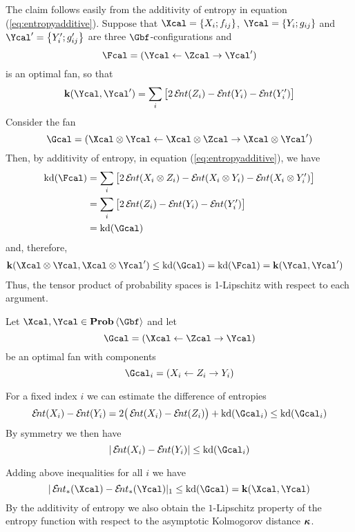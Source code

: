 \begin{Proof}
  The claim follows easily from the additivity of
  entropy in equation (\ref{eq:entropyadditive}). Suppose that
  $\Xcal=\set{X_{i};f_{ij}}$, $\Ycal=\set{Y_{i};g_{ij}}$ and
  $\Ycal'=\set{Y'_{i};g'_{ij}}$ are three $\Gbf$-configurations and
  \[
  \Fcal
  =
  (\Ycal\ot \Zcal\to \Ycal')
  \]
  is an optimal fan, so that
  \[
  \ikd(\Ycal,\Ycal')
  =
  \sum_{i} \big[2\ent(Z_{i})-\ent(Y_{i})-\ent(Y'_{i})\big]
  \]
  Consider the fan
  \[
  \Gcal
  =
  (\Xcal\otimes \Ycal\ot \Xcal\otimes \Zcal\to \Xcal\otimes \Ycal')
  \]
  Then, by additivity of entropy, in equation (\ref{eq:entropyadditive}), we have
  \begin{align*}
    \kd(\Fcal)
    &=
    \sum_{i}\big[2\ent(X_{i}\otimes Z_{i})-\ent(X_{i}\otimes Y_{i}) -
      \ent(X_{i}\otimes Y'_{i})\big]
    \\
    &=
    \sum_{i}\big[2\ent(Z_{i})-\ent(Y_{i}) -
                 \ent(Y'_{i})\big]
    \\
    &=
    \kd(\Gcal)
  \end{align*}
  and, therefore,
  \begin{align*}
    \ikd(\Xcal\otimes \Ycal,\Xcal\otimes \Ycal')
    &\leq
    \kd(\Gcal)=\kd(\Fcal)=\ikd(\Ycal,\Ycal')
  \end{align*}
  Thus, the tensor product of probability spaces is 1-Lipschitz with
  respect to each argument.
\end{Proof}
  
\begin{Proof}

  Let $\Xcal,\Ycal\in\prob\<\Gbf>$ and let
  \[
  \Gcal=(\Xcal\ot\Zcal\to\Ycal)
  \]
  be an optimal fan with components
  \[
  \Gcal_{i}=(X_{i}\ot Z_{i}\to Y_{i})
  \]
  
  For a fixed index $i$ we can estimate
  the difference of entropies
  \[
    \ent(X_{i})-\ent(Y_{i})
    =
    2\big(\ent(X_{i})-\ent(Z_{i})\big) + \kd(\Gcal_{i})
    \leq
    \kd(\Gcal_{i})
  \]
  By symmetry we then have
  \[
  |\ent(X_{i})-\ent(Y_{i})|
  \leq
  \kd(\Gcal_{i})    
  \]

  Adding above inequalities for all $i$ we have
  \[
  |\ent_{*}(\Xcal)-\ent_{*}(\Ycal)|_{1}
  \leq
  \kd(\Gcal)=\ikd(\Xcal,\Ycal)
  \]
  By the additivity of entropy we also obtain the $1$-Lipschitz
  property of the entropy function with respect to the asymptotic
  Kolmogorov distance $\operatorname{{\bm\kappa}}$.
\end{Proof}






